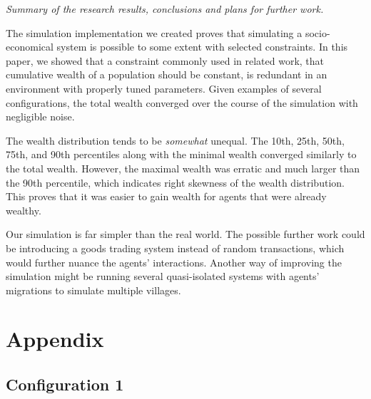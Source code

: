 \documentclass[english]{projectreport}
\begin{document}

\emph{Summary of the research results, conclusions and plans for further work.}

The simulation implementation we created proves that simulating a socio-economical system is possible to some extent with selected constraints. In this paper, we showed that a constraint commonly used in related work, that cumulative wealth of a population should be constant, is redundant in an environment with properly tuned parameters. Given examples of several configurations, the total wealth converged over the course of the simulation with negligible noise. 

The wealth distribution tends to be \textit{somewhat} unequal. The 10th, 25th, 50th, 75th, and 90th percentiles along with the minimal wealth converged similarly to the total wealth. However, the maximal wealth was erratic and much larger than the 90th percentile, which indicates right skewness of the wealth distribution. This proves that it was easier to gain wealth for agents that were already wealthy.

Our simulation is far simpler than the real world. The possible further work could be introducing a goods trading system instead of random transactions, which would further nuance the agents' interactions. Another way of improving the simulation might be running several quasi-isolated systems with agents' migrations to simulate multiple villages.

\printbibliography


\section*{Appendix}
\label{sec:appendix}

\subsection*{Configuration 1}
\end{document}
